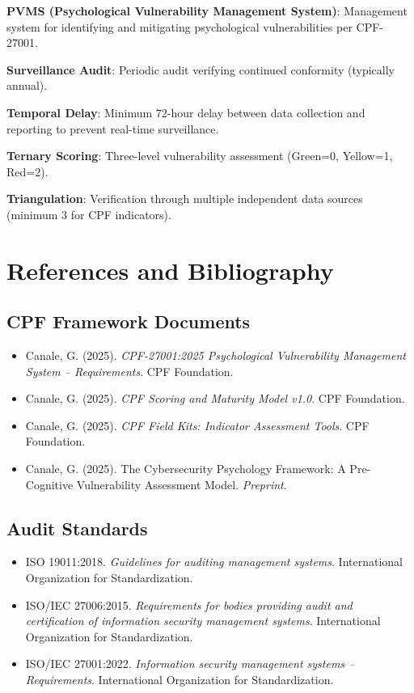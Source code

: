 \documentclass[11pt,a4paper]{article}
\begin{document}
\textbf{PVMS (Psychological Vulnerability Management System)}: Management system for identifying and mitigating psychological vulnerabilities per CPF-27001.

\textbf{Surveillance Audit}: Periodic audit verifying continued conformity (typically annual).

\textbf{Temporal Delay}: Minimum 72-hour delay between data collection and reporting to prevent real-time surveillance.

\textbf{Ternary Scoring}: Three-level vulnerability assessment (Green=0, Yellow=1, Red=2).

\textbf{Triangulation}: Verification through multiple independent data sources (minimum 3 for CPF indicators).

\section{References and Bibliography}

\subsection{CPF Framework Documents}

\begin{itemize}
\item Canale, G. (2025). \textit{CPF-27001:2025 Psychological Vulnerability Management System -- Requirements}. CPF Foundation.
\item Canale, G. (2025). \textit{CPF Scoring and Maturity Model v1.0}. CPF Foundation.
\item Canale, G. (2025). \textit{CPF Field Kits: Indicator Assessment Tools}. CPF Foundation.
\item Canale, G. (2025). The Cybersecurity Psychology Framework: A Pre-Cognitive Vulnerability Assessment Model. \textit{Preprint}.
\end{itemize}

\subsection{Audit Standards}

\begin{itemize}
\item ISO 19011:2018. \textit{Guidelines for auditing management systems}. International Organization for Standardization.
\item ISO/IEC 27006:2015. \textit{Requirements for bodies providing audit and certification of information security management systems}. International Organization for Standardization.
\item ISO/IEC 27001:2022. \textit{Information security management systems -- Requirements}. International Organization for Standardization.
\end{itemize}
\end{document}
